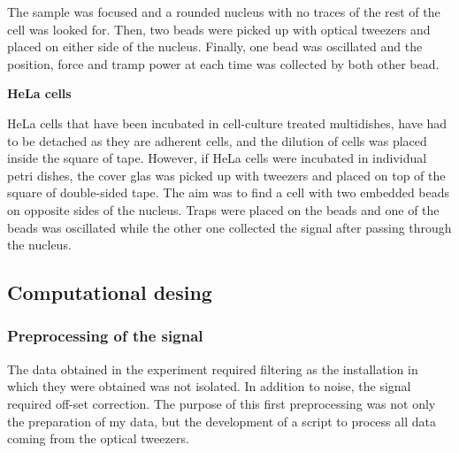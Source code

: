 \documentclass[12pt, a4paper]{article} %
\begin{document}
	\setlength{\parindent}{8pt}
	
	The sample was focused and a rounded nucleus with no traces of the rest of the cell was looked for. Then, two beads were picked up with optical tweezers and placed on either side of the nucleus. Finally, one bead was oscillated and the position, force and tramp power at each time was collected by both other bead.
	
	\setlength{\parindent}{0pt}
	
	\newpage
	
	{\textbf{HeLa cells}}
	
	HeLa cells that have been incubated in cell-culture treated multidishes, have had to be detached as they are adherent cells, and the dilution of cells was placed inside the square of tape. However, if HeLa cells were incubated in individual petri dishes, the cover glas was picked up with tweezers and placed on top of the square of double-sided tape. The aim was to find a cell with two embedded beads on opposite sides of the nucleus. Traps were placed on the beads and one of the beads was oscillated while the other one collected the signal after passing through the nucleus.
	
	\setlength{\parindent}{8pt}
	
	\setlength{\parskip}{0mm}
	
	\subsection{Computational desing}
	
	\subsubsection{Preprocessing of the signal}
	
	The data obtained in the experiment required filtering as the installation in which they were obtained was not isolated. In addition to noise, the signal required off-set correction. The purpose of this first preprocessing was not only the preparation of my data, but the development of a script to process all data coming from the optical tweezers. 
	
\end{document}
